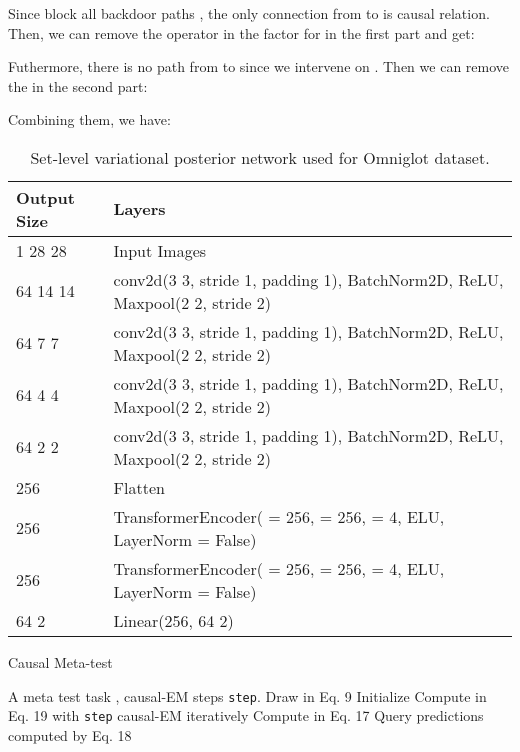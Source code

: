 \documentclass[letterpaper]{article} \usepackage{aaai23}  \usepackage{times}  \usepackage{helvet}  \usepackage{courier}  \usepackage[hyphens]{url}  \usepackage{graphicx} \urlstyle{rm} \def\UrlFont{\rm}  \usepackage{natbib}  \usepackage{caption} \frenchspacing  \setlength{\pdfpagewidth}{8.5in}  \setlength{\pdfpageheight}{11in}  \usepackage{algorithm}
\theoremstyle{plain}
\theoremstyle{definition}
\theoremstyle{remark}
\begin{document}
Since  block all backdoor paths , the only connection from  to  is causal relation. Then, we can remove the  operator in the factor for  in the first part and get:

Futhermore, there is no path from  to  since we intervene on . Then we can remove the  in the second part:

Combining them, we have:


\begin{table*}[t]
	\centering
	\caption{Set-level variational posterior network  used for Omniglot dataset.}  
	\label{tab:app_set_omn}
	\begin{tabular}{ll}
		\toprule
		Output Size                 & Layers                                                                                           \\ \midrule
		1  28  28   & Input Images                                                                                     \\
		64   14  14 & conv2d(3  3, stride 1, padding 1), BatchNorm2D, ReLU, Maxpool(2  2, stride 2)    \\
		64  7  7    & conv2d(3  3, stride 1, padding 1), BatchNorm2D, ReLU, Maxpool(2  2, stride 2)    \\
		64  4  4    & conv2d(3  3, stride 1, padding 1), BatchNorm2D, ReLU, Maxpool(2  2, stride 2)    \\
		64  2  2    & conv2d(3  3, stride 1, padding 1), BatchNorm2D, ReLU, Maxpool(2  2, stride 2)    \\
		256                         & Flatten                                                                                          \\
		256                         & TransformerEncoder( = 256,  = 256,  = 4, ELU, LayerNorm = False) \\
		256                         & TransformerEncoder( = 256,  = 256,  = 4, ELU, LayerNorm = False) \\
		64  2               & Linear(256, 64  2) \\ \bottomrule
	\end{tabular}
\end{table*}


\begin{algorithm}[t]
	\caption{Causal Meta-test}
	\label{alg:meta-test}
	\begin{algorithmic}
		 A meta test task , causal-EM steps \texttt{step}.
		\STATE Draw  in Eq. 9
		\STATE Initialize 
		\STATE Compute  in Eq. 19 with \texttt{step} causal-EM iteratively 
		\STATE Compute  in Eq. 17
			Query predictions  computed by Eq. 18			
	\end{algorithmic}
\end{algorithm}
\end{document}
